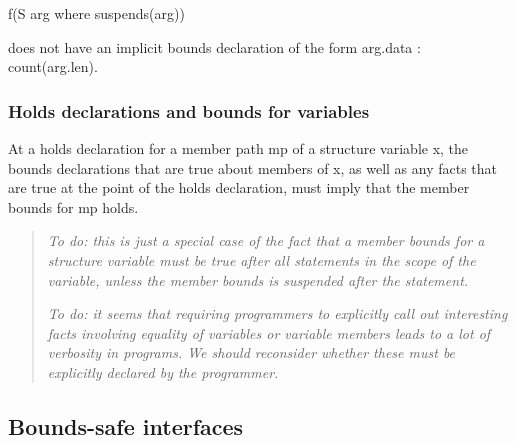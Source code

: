 \documentclass[]{article}
\begin{document}
f(S arg where suspends(arg))

does not have an implicit bounds declaration of the form arg.data :
count(arg.len).

\subsubsection{\texorpdfstring{\protect\hypertarget{ux5fToc435434981}{}{\protect\hypertarget{ux5fToc437460814}{}{\protect\hypertarget{ux5fToc440445495}{}{\protect\hypertarget{ux5fToc440449277}{}{\protect\hypertarget{ux5fToc440551927}{}{}}}}}Holds
declarations and bounds for
variables}{Holds declarations and bounds for variables}}\label{holds-declarations-and-bounds-for-variables}

At a holds declaration for a member path mp of a structure variable x,
the bounds declarations that are true about members of x, as well as any
facts that are true at the point of the holds declaration, must imply
that the member bounds for mp holds.

\begin{quote}
\emph{To do: this is just a special case of the fact that a member
bounds for a structure variable must be true after all statements in the
scope of the variable, unless the member bounds is suspended after the
statement. }

\emph{To do: it seems that requiring programmers to explicitly call out
interesting facts involving equality of variables or variable members
leads to a lot of verbosity in programs. We should reconsider whether
these must be explicitly declared by the programmer.}
\end{quote}

\subsection{\texorpdfstring{\protect\hypertarget{ux5fToc422751620}{}{\protect\hypertarget{ux5fToc422915738}{}{\protect\hypertarget{ux5fToc422915847}{}{\protect\hypertarget{ux5fToc423095711}{}{\protect\hypertarget{ux5fToc423102937}{}{\protect\hypertarget{ux5fToc423445538}{}{\protect\hypertarget{ux5fToc424307391}{}{\protect\hypertarget{ux5fToc424307709}{}{\protect\hypertarget{ux5fToc424559605}{}{\protect\hypertarget{ux5fToc424560038}{}{\protect\hypertarget{ux5fToc424560114}{}{\protect\hypertarget{ux5fToc424569259}{}{\protect\hypertarget{ux5fToc424571656}{}{\protect\hypertarget{ux5fToc424822127}{}{\protect\hypertarget{ux5fToc424825315}{}{\protect\hypertarget{ux5fToc424825396}{}{\protect\hypertarget{ux5fToc424910085}{}{\protect\hypertarget{ux5fToc424910165}{}{\protect\hypertarget{ux5fToc424910277}{}{\protect\hypertarget{ux5fToc424921905}{}{\protect\hypertarget{ux5fToc425166855}{}{\protect\hypertarget{ux5fToc435434982}{}{\protect\hypertarget{ux5fToc437460815}{}{\protect\hypertarget{ux5fToc440445496}{}{\protect\hypertarget{ux5fToc440449278}{}{\protect\hypertarget{ux5fToc440551928}{}{}}}}}}}}}}}}}}}}}}}}}}}}}}Bounds-safe
interfaces}{Bounds-safe interfaces}}\label{bounds-safe-interfaces}
\end{document}
